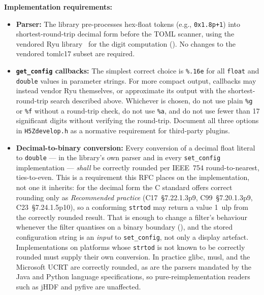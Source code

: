 \documentclass[../RFC-HDFG-2026-001.tex]{subfiles}
\begin{document}
\begin{notebox}
\textbf{Implementation requirements:}
\begin{itemize}
  \item \textbf{Parser:} The library pre-processes hex-float tokens
    (e.g., \texttt{0x1.8p+1}) into shortest-round-trip decimal form before
    the TOML scanner, using the vendored Ryu library~\cite{ryu} for the
    digit computation ().  No changes to the
    vendored tomlc17 subset are required.
  \item \textbf{\texttt{get\_config} callbacks:} The simplest correct choice
    is \texttt{\%.16e} for all \texttt{float} and \texttt{double} values in
    parameter strings.  For more compact output, callbacks may instead
    vendor Ryu themselves, or approximate its output with the
    shortest-round-trip search described above.  Whichever is chosen, do not
    use plain \texttt{\%g} or \texttt{\%f} without a round-trip check, do not
    use \texttt{\%a}, and do not use fewer than 17 significant digits
    without verifying the round-trip.  Document all three options in
    \texttt{H5Zdevelop.h} as a normative requirement for third-party
    plugins.
  \item \textbf{Decimal-to-binary conversion:} Every conversion of a decimal
    float literal to \texttt{double} --- in the library's own parser and in
    every \texttt{set\_config} implementation --- \emph{shall} be correctly
    rounded per IEEE~754 round-to-nearest, ties-to-even.  This is a
    requirement this RFC places on the implementation, not one it inherits:
    for the decimal form the C standard offers correct rounding only as
    \emph{Recommended practice} (C17~\S7.22.1.3p9, C99~\S7.20.1.3p9,
    C23~\S7.24.1.5p10), so a conforming \texttt{strtod} may return a value
    1~ulp from the correctly rounded result.  That is enough to change a
    filter's behaviour whenever the filter quantises on a binary boundary
    (), and the stored configuration
    string is an \emph{input} to \texttt{set\_config}, not only a display
    artefact.  Implementations on platforms whose \texttt{strtod} is not
    known to be correctly rounded must supply their own conversion.  In
    practice glibc, musl, and the Microsoft UCRT are correctly rounded, as
    are the parsers mandated by the Java and Python language
    specifications, so pure-reimplementation readers such as jHDF and
    pyfive are unaffected.


\end{itemize}
\end{notebox}
\end{document}
